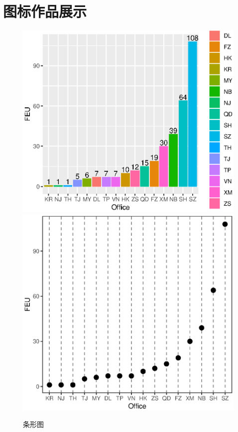 \section{图标作品展示}
\begin{figure}[h]
	\begin{center}
		\caption{条形图}
		\includegraphics[scale=0.45]{eps/Rplot01}
		\qquad
		\includegraphics[scale=0.46]{eps/Rplot13}
		\end{center}
		\end{figure}
